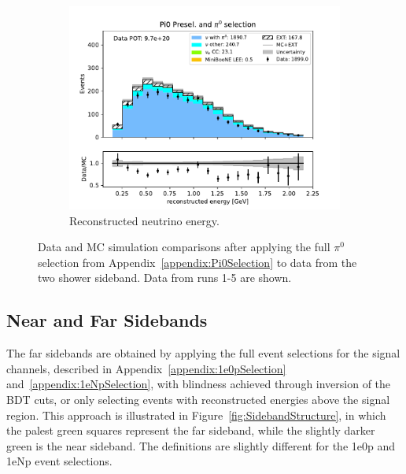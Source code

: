 \begin{figure}[H]
    \begin{subfigure}{0.33\linewidth}
        \includegraphics[width=\linewidth]{technote/Sidebands/Figures/TwoShowerSideband/two_shr_sideband_reco_e_run1234b4c4d_PI0_PI0.pdf}
        \caption{Reconstructed neutrino energy.}
    \end{subfigure}
    \caption{Data and MC simulation comparisons after applying the full $\pi^0$ selection from Appendix~\ref{appendix:Pi0Selection} to data from the two shower sideband. Data from runs 1-5 are shown.}
    \label{fig:Pi0SidebandRuns12345}
\end{figure}

\subsection{Near and Far Sidebands}
\label{sec:FarSideband}

The far sidebands are obtained by applying the full event selections for the signal channels, described in Appendix~\ref{appendix:1e0pSelection} and~\ref{appendix:1eNpSelection}, with blindness achieved through inversion of the BDT cuts, or only selecting events with reconstructed energies above the signal region. This approach is illustrated in Figure~\ref{fig:SidebandStructure}, in which the palest green squares represent the far sideband, while the slightly darker green is the near sideband. The definitions are slightly different for the 1e0p and 1eNp event selections.


